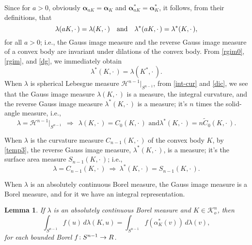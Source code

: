 \documentclass{cpamart1}     %
\newtheorem{lemm}[theo]{Lemma}
\theoremstyle{definition}
\theoremstyle{remark}
\newcommand{\sn}{S^{n-1}}
\newcommand{\kno}{\mathcal K^n_o}
\newcommand{\balpha}{\pmb{\alpha}}
\newcommand{\wt}{\widetilde}
\begin{document}
Since for $a>0$,
obviously $\balpha_{aK}=\balpha_K$ and
$\balpha^*_{aK}=\balpha^*_K$, it follows, from their definitions, that
\begin{equation*}
\text{$\lambda(aK,\cdot\,)=\lambda(K,\cdot\,)$\quad
and\quad $\lambda^*(aK,\cdot\,)=\lambda^*(K,\cdot\,)$},
\end{equation*}
for all $a>0$; i.e., the Gauss image measure and the reverse Gauss image measure
 of a convex body are invariant under dilations of the convex body.
From
\eqref{rgim0}, \eqref{rgim}, and \eqref{dg}, we immediately obtain
\begin{equation}\label{dgi}
\lambda^*(K,\cdot\,) = \lambda(K^*,\cdot\,).
\end{equation}
When $\lambda$ is spherical Lebesgue measure $\mathcal H^{n-1}|_{\sn}$,
from \eqref{int-cur} and \eqref{dic}, we see that the Gauss image measure
$\lambda(K,\cdot\,)$ is a measure, the integral curvature, and the reverse Gauss
image measure $\lambda^*(K,\cdot\,)$ is a measure;
it's $n$ times the solid-angle measure, i.e.,
\[
\lambda = \mathcal H^{n-1}|_{\sn} \ \  \Longrightarrow \ \  \text{$\lambda(K,\cdot\,)
= C_0(K,\cdot\,)$ and
$\lambda^*(K,\cdot\,) = n \wt C_0(K,\cdot\,)$}.
\]




When $\lambda$ is the curvature measure $C_{n-1}(K, \cdot\,)$ of the convex body $K$,
by \eqref{temp3},
the reverse Gauss image measure, $\lambda^*(K,\cdot\,)$, is a measure; it's the surface area measure $S_{n-1}(K,\cdot\,)$; i.e.,
\[
\lambda = C_{n-1}(K, \cdot\,)\  \Longrightarrow \ \lambda^*(K,\cdot\,)= S_{n-1}(K,\cdot\,).
\]


When $\lambda$ is an absolutely continuous Borel measure, the Gauss image measure is a Borel measure, and for it we have an integral representation. 


\begin{lemm}\label{di}
If $\lambda$ is an absolutely continuous Borel measure and $K\in \kno$, then
\begin{equation}\label{di1}
\int_{\sn} f(u)\, d\lambda(K,u) = \int_{\sn} f(\alpha_K^*(v))\, d\lambda(v),
\end{equation}
for each bounded Borel $f\negthinspace :\sn \to \mathbb R$.
\end{lemm}
\end{document}

